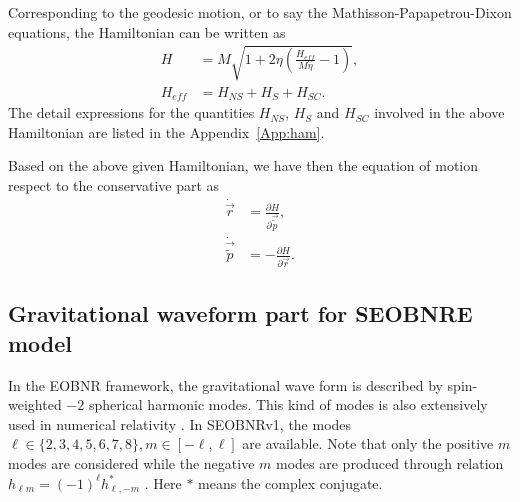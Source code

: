 \documentclass[prd,aps,a4paper,superscriptaddress,twocolumn,footinbib,showpacs]{revtex4}
\begin{document}
Corresponding to the geodesic motion, or to say the Mathisson-Papapetrou-Dixon equations, the Hamiltonian can be written as \cite{PhysRevD.84.104027,PhysRevD.86.024011}
\begin{align}
H&=M\sqrt{1+2\eta(\frac{H_{eff}}{M\eta}-1)},\label{SEOBNREHtotal}\\
H_{eff}&=H_{NS}+H_S+H_{SC}.\label{SEOBNREHterms}
\end{align}
The detail expressions for the quantities $H_{NS}$, $H_{S}$ and $H_{SC}$ involved in the above Hamiltonian are listed in the Appendix~\ref{App:ham}.

Based on the above given Hamiltonian, we have then the equation of motion respect to the conservative part as
\begin{align}
\dot{\vec{r}}&=\frac{\partial H}{\partial\vec{\tilde{p}}},\label{dynr}\\
\dot{\vec{\tilde{p}}}&=-\frac{\partial H}{\partial\vec{r}}.\label{dynp}
\end{align}
\subsection{Gravitational waveform part for SEOBNRE model}
In the EOBNR framework, the gravitational wave form is described by spin-weighted $-2$ spherical harmonic modes. This kind of modes is also extensively used in numerical relativity \cite{bai11}. In SEOBNRv1, the modes $\ell\in\{2,3,4,5,6,7,8\},m\in[-\ell,\ell]$ are available. Note that only the positive $m$ modes are considered while the negative $m$ modes are produced through relation $h_{\ell m}=(-1)^\ell h_{\ell,-m}^*$ \cite{PhysRevD.84.124052}. Here $*$ means the complex conjugate.
\end{document}
